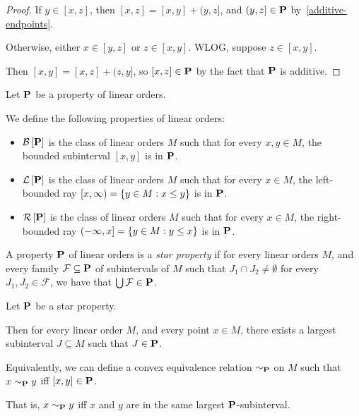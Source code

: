 \begin{proof}
  If $y \in [x, z]$, then $[x, z] = [x, y] + (y, z]$,
  and $(y, z] \in \mathbf{P}$ by~\cref{additive-endpoints}.

  Otherwise, either $x \in [y, z]$ or $z \in [x, y]$.
  WLOG, suppose $z \in [x, y]$.

  Then $[x, y] = [x, z] + (z, y]$,
  so $[x, z] \in \mathbf{P}$ by the fact that $\mathbf{P}$ is additive.
\end{proof}

\begin{definitions}
  Let $\mathbf{P}$ be a property of linear orders.

  We define the following properties of linear orders:
  \begin{itemize}
    \item $\mathcal{B} \left[ {{\mathbf{P}}} \right]$ is the class of linear orders $M$ such that for every $x, y \in M$,
          the bounded subinterval $[x, y]$ is in $\mathbf{P}$.
    \item $\mathcal{L} \left[ {{\mathbf{P}}} \right]$ is the class of linear orders $M$ such that for every $x \in M$,
          the left-bounded ray $[x, \infty) = \left\{ {y \in M : x \le y} \right\}$ is in $\mathbf{P}$.
    \item $\mathcal{R} \left[ {{\mathbf{P}}} \right]$ is the class of linear orders $M$ such that for every $x \in M$,
          the right-bounded ray $(-\infty, x] = \left\{ {y \in M : y \le x} \right\}$ is in $\mathbf{P}$.
  \end{itemize}
\end{definitions}

\begin{definition}
  A property $\mathbf{P}$ of linear orders is a \emph{star property} if
  for every linear orders $M$, and every family $\mathcal{F} \subseteq \mathbf{P}$
  of subintervals of $M$ such that $J_1 \cap J_2 \ne \emptyset$
  for every $J_1, J_2 \in \mathcal{F}$, we have that
  $\bigcup \mathcal{F} \in \mathbf{P}$.
\end{definition}

\begin{lemma}
  Let $\mathbf{P}$ be a star property.

  Then for every linear order $M$,
  and every point $x \in M$, there exists a largest subinterval $J \subseteq M$ such that
  $J \in \mathbf{P}$.

  Equivalently, we can define a convex equivalence relation $\sim_{\mathbf{P}}$ on $M$ such that $x \sim_{\mathbf{P}} y$ iff $[x, y] \in \mathbf{P}$.

  That is,
  $x \sim_{\mathbf{P}} y$ iff $x$ and $y$ are in the same largest $\mathbf{P}$-subinterval.

\end{lemma}

